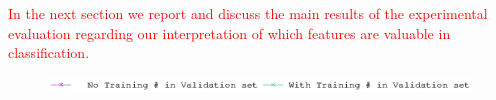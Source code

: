\textcolor{red}{In the next section we  report and discuss the main results of the experimental evaluation regarding our interpretation of which features are valuable in classification.}


\begin{figure}[t!]
\begin{centering}
\includegraphics[width=14cm]{images/validation_comparaison/legend.eps}
\par\end{centering}
\begin{centering}
\par\end{centering}
\begin{centering}

\end{centering}
\end{figure}
